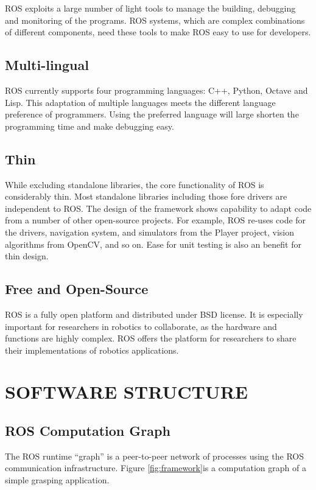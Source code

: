 \documentclass[a4paper, 10pt, conference]{ieeeconf}       %
\begin{document}
ROS exploits a large number of light tools to manage the building, debugging and monitoring of the programs. ROS systems, which are complex combinations of different components, need these tools to make ROS easy to use for developers.

\subsection{Multi-lingual}

ROS currently supports four programming languages: C++, Python, Octave and Lisp. This adaptation of multiple languages meets the different language preference of programmers. Using the preferred language will large shorten the programming time and make debugging easy.

\subsection{Thin}

While excluding standalone libraries, the core functionality of ROS is considerably thin. Most standalone libraries including those fore drivers are independent to ROS. The design of the framework shows capability to adapt code from a number of other open-source projects. For example, ROS re-uses code for the drivers, navigation system, and simulators from the Player project, vision algorithms from OpenCV, and so on. Ease for unit testing is also an benefit for thin design.

\subsection{Free and Open-Source}

ROS is a fully open platform and distributed under BSD license. It is especially important for researchers in robotics to collaborate, as the hardware and functions are highly complex. ROS offers the platform for researchers to share their implementations of robotics applications.

\section{SOFTWARE STRUCTURE}

\subsection{ROS Computation Graph}
The ROS runtime ``graph'' is a peer-to-peer network of processes using the ROS communication infrastructure. Figure \ref{fig:framework}is a computation graph of a simple grasping application.
\end{document}

